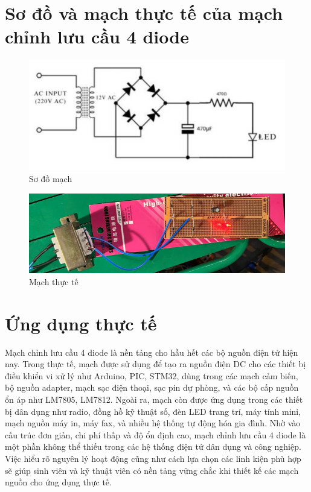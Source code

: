 \documentclass[a4paper,15pt]{article}
\begin{document}
\section{Sơ đồ và mạch thực tế của mạch chỉnh lưu cầu 4 diode}
\begin{figure}[H]
    \centering
    \includegraphics[scale=0.6]{img/Sodomach.png}
    \caption{Sơ đồ mạch}
    \label{fig:enter-label}
\end{figure}
\begin{figure}[H]
    \centering
    \includegraphics[scale=0.45]{img/Machthucte.PNG}
    \caption{Mạch thực tế}
    \label{fig:enter-label}
\end{figure}
\section{Ứng dụng thực tế}
Mạch chỉnh lưu cầu 4 diode là nền tảng cho hầu hết các bộ nguồn điện tử hiện nay. Trong 
thực tế, mạch được sử dụng để tạo ra nguồn điện DC cho các thiết bị điều khiển vi xử lý như 
Arduino, PIC, STM32, dùng trong các mạch cảm biến, bộ nguồn adapter, mạch sạc điện 
thoại, sạc pin dự phòng, và các bộ cấp nguồn ổn áp như LM7805, LM7812.  
Ngoài ra, mạch còn được ứng dụng trong các thiết bị dân dụng như radio, đồng hồ kỹ thuật 
số, đèn LED trang trí, máy tính mini, mạch nguồn máy in, máy fax, và nhiều hệ thống tự động 
hóa gia đình. 
Nhờ vào cấu trúc đơn giản, chi phí thấp và độ ổn định cao, mạch chỉnh lưu cầu 4 diode là 
một phần không thể thiếu trong các hệ thống điện tử dân dụng và công nghiệp. Việc hiểu rõ 
nguyên lý hoạt động cũng như cách lựa chọn các linh kiện phù hợp sẽ giúp sinh viên và kỹ 
thuật viên có nền tảng vững chắc khi thiết kế các mạch nguồn cho ứng dụng thực tế.
\end{document}
